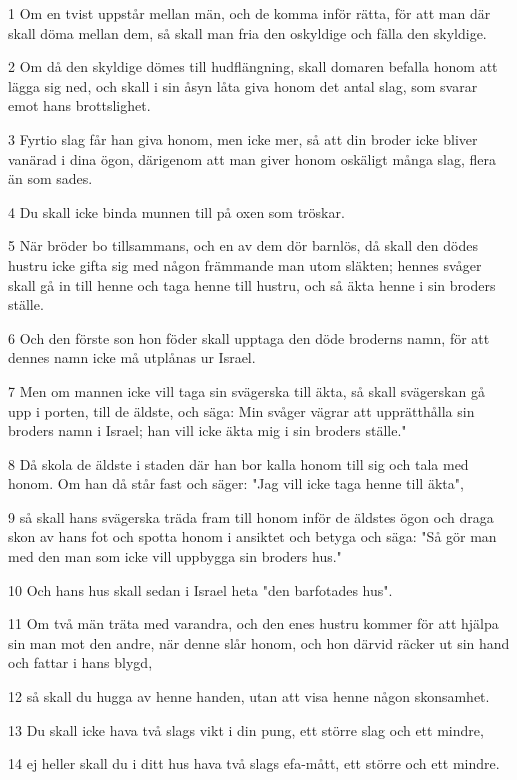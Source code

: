 \par 1 Om en tvist uppstår mellan män, och de komma inför rätta, för att man där skall döma mellan dem, så skall man fria den oskyldige och fälla den skyldige.
\par 2 Om då den skyldige dömes till hudflängning, skall domaren befalla honom att lägga sig ned, och skall i sin åsyn låta giva honom det antal slag, som svarar emot hans brottslighet.
\par 3 Fyrtio slag får han giva honom, men icke mer, så att din broder icke bliver vanärad i dina ögon, därigenom att man giver honom oskäligt många slag, flera än som sades.
\par 4 Du skall icke binda munnen till på oxen som tröskar.
\par 5 När bröder bo tillsammans, och en av dem dör barnlös, då skall den dödes hustru icke gifta sig med någon främmande man utom släkten; hennes svåger skall gå in till henne och taga henne till hustru, och så äkta henne i sin broders ställe.
\par 6 Och den förste son hon föder skall upptaga den döde broderns namn, för att dennes namn icke må utplånas ur Israel.
\par 7 Men om mannen icke vill taga sin svägerska till äkta, så skall svägerskan gå upp i porten, till de äldste, och säga: Min svåger vägrar att upprätthålla sin broders namn i Israel; han vill icke äkta mig i sin broders ställe."
\par 8 Då skola de äldste i staden där han bor kalla honom till sig och tala med honom. Om han då står fast och säger: "Jag vill icke taga henne till äkta",
\par 9 så skall hans svägerska träda fram till honom inför de äldstes ögon och draga skon av hans fot och spotta honom i ansiktet och betyga och säga: "Så gör man med den man som icke vill uppbygga sin broders hus."
\par 10 Och hans hus skall sedan i Israel heta "den barfotades hus".
\par 11 Om två män träta med varandra, och den enes hustru kommer för att hjälpa sin man mot den andre, när denne slår honom, och hon därvid räcker ut sin hand och fattar i hans blygd,
\par 12 så skall du hugga av henne handen, utan att visa henne någon skonsamhet.
\par 13 Du skall icke hava två slags vikt i din pung, ett större slag och ett mindre,
\par 14 ej heller skall du i ditt hus hava två slags efa-mått, ett större och ett mindre.
